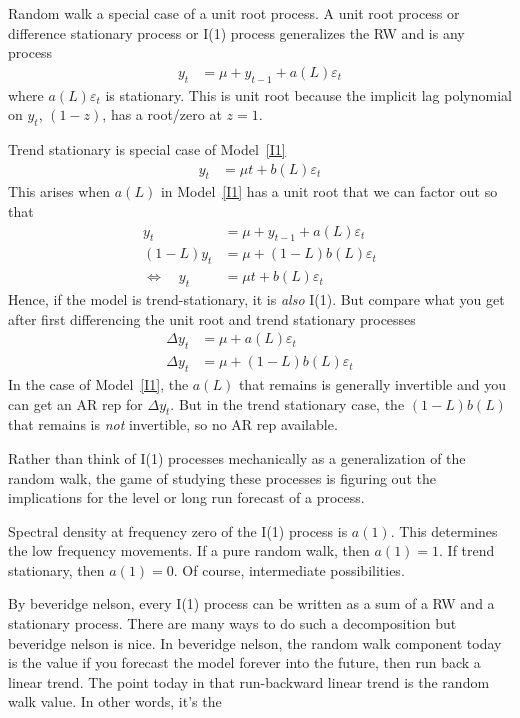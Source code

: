\documentclass[12pt]{article}
\theoremstyle{plain}
\theoremstyle{definition}
\theoremstyle{remark}
\begin{document}
Random walk a special case of a unit root process. A unit root process
or difference stationary process or I(1) process generalizes the RW and
is any process
\begin{align}
  y_t &= \mu + y_{t-1} + a(L)\varepsilon_t
  \label{I1}
\end{align}
where $a(L)\varepsilon_t$ is stationary.
This is unit root because the implicit lag polynomial on $y_t$,
$(1-z)$, has a root/zero at $z=1$.

Trend stationary is special case of Model~\ref{I1}
\begin{align*}
  y_t &= \mu t + b(L)\varepsilon_t
\end{align*}
This arises when $a(L)$ in Model~\ref{I1} has a unit root that we can
factor out so that
\begin{align*}
  y_t
  &= \mu + y_{t-1} + a(L)\varepsilon_t
  \\
  (1-L)y_t
  &= \mu + (1-L)b(L)\varepsilon_t
  \\
  \iff\quad
  y_t
  &=
  \mu t
  +
  b(L)\varepsilon_t
\end{align*}
Hence, if the model is trend-stationary, it is \emph{also} I(1).
But compare what you get after first differencing the unit root and
trend stationary processes
\begin{align*}
  \Delta y_t
  &= \mu + a(L)\varepsilon_t\\
  \Delta y_t
  &=
  \mu + (1-L)b(L)\varepsilon_t
\end{align*}
In the case of Model~\ref{I1}, the $a(L)$ that remains is generally
invertible and you can get an AR rep for $\Delta y_t$.
But in the trend stationary case, the $(1-L)b(L)$ that remains is
\emph{not} invertible, so no AR rep available.

Rather than think of I(1) processes mechanically as a generalization of
the random walk, the game of studying these processes is figuring out
the implications for the level or long run forecast of a process.

Spectral density at frequency zero of the I(1) process is $a(1)$.
This determines the low frequency movements.
If a pure random walk, then $a(1)=1$.
If trend stationary, then $a(1)=0$.
Of course, intermediate possibilities.

By beveridge nelson, every I(1) process can be written as a sum of a RW
and a stationary process.
There are many ways to do such a decomposition but beveridge nelson is
nice.
In beveridge nelson, the random walk component today is the value if you
forecast the model forever into the future, then run back a linear
trend. The point today in that run-backward linear trend is the random
walk value.
In other words, it's the
\end{document}
